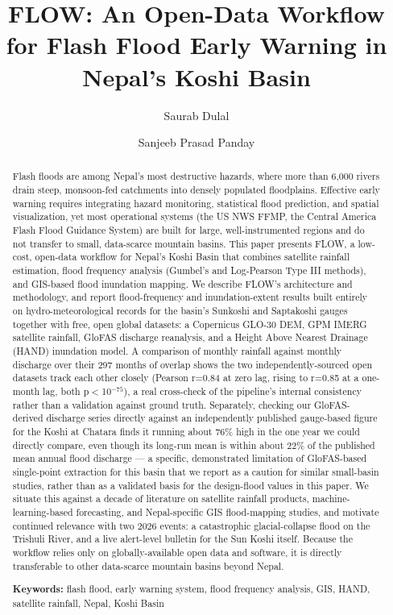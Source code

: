 \documentclass[11pt]{article}
\title{FLOW: An Open-Data Workflow for Flash Flood Early Warning in Nepal's Koshi Basin}
\author{
  Saurab Dulal \and Sanjeeb Prasad Panday
}
\date{}
\begin{document}
\maketitle

\begin{abstract}
Flash floods are among Nepal's most destructive hazards, where more than 6,000 rivers drain steep, monsoon-fed catchments into densely populated floodplains. Effective early warning requires integrating hazard monitoring, statistical flood prediction, and spatial visualization, yet most operational systems (the US NWS FFMP, the Central America Flash Flood Guidance System) are built for large, well-instrumented regions and do not transfer to small, data-scarce mountain basins. This paper presents FLOW, a low-cost, open-data workflow for Nepal's Koshi Basin that combines satellite rainfall estimation, flood frequency analysis (Gumbel's and Log-Pearson Type III methods), and GIS-based flood inundation mapping. We describe FLOW's architecture and methodology, and report flood-frequency and inundation-extent results built entirely on hydro-meteorological records for the basin's Sunkoshi and Saptakoshi gauges together with free, open global datasets: a Copernicus GLO-30 DEM, GPM IMERG satellite rainfall, GloFAS discharge reanalysis, and a Height Above Nearest Drainage (HAND) inundation model. A comparison of monthly rainfall against monthly discharge over their 297 months of overlap shows the two independently-sourced open datasets track each other closely (Pearson r=0.84 at zero lag, rising to r=0.85 at a one-month lag, both p$<$10$^{-75}$), a real cross-check of the pipeline's internal consistency rather than a validation against ground truth. Separately, checking our GloFAS-derived discharge series directly against an independently published gauge-based figure for the Koshi at Chatara finds it running about 76\% high in the one year we could directly compare, even though its long-run mean is within about 22\% of the published mean annual flood discharge --- a specific, demonstrated limitation of GloFAS-based single-point extraction for this basin that we report as a caution for similar small-basin studies, rather than as a validated basis for the design-flood values in this paper. We situate this against a decade of literature on satellite rainfall products, machine-learning-based forecasting, and Nepal-specific GIS flood-mapping studies, and motivate continued relevance with two 2026 events: a catastrophic glacial-collapse flood on the Trishuli River, and a live alert-level bulletin for the Sun Koshi itself. Because the workflow relies only on globally-available open data and software, it is directly transferable to other data-scarce mountain basins beyond Nepal.

\medskip
\noindent\textbf{Keywords:} flash flood, early warning system, flood frequency analysis, GIS, HAND, satellite rainfall, Nepal, Koshi Basin
\end{abstract}
\end{document}
